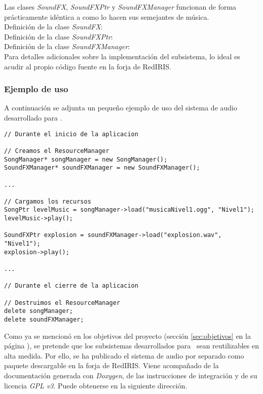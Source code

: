 Las clases \textit{SoundFX}, \textit{SoundFXPtr} y \textit{SoundFXManager}
funcionan de forma prácticamente idéntica a como lo hacen sus semejantes
de música.\\

Definición de la clase \textit{SoundFX}:\\



Definición de la clase \textit{SoundFXPtr}:\\



Definición de la clase \textit{SoundFXManager}:\\



Para detalles adicionales sobre la implementación del subsistema, lo ideal
es acudir al propio código fuente en la forja de RedIRIS.\\

\subsubsection{Ejemplo de uso}

A continuación se adjunta un pequeño ejemplo de uso del sistema de audio
desarrollado para \juego.

\begin{lstlisting}[style=C++]
// Durante el inicio de la aplicacion

// Creamos el ResourceManager
SongManager* songManager = new SongManager();
SoundFXManager* soundFXManager = new SoundFXManager();

...

// Cargamos los recursos
SongPtr levelMusic = songManager->load("musicaNivel1.ogg", "Nivel1");
levelMusic->play();

SoundFXPtr explosion = soundFXManager->load("explosion.wav", "Nivel1");
explosion->play();

...

// Durante el cierre de la aplicacion

// Destruimos el ResourceManager
delete songManager;
delete soundFXManager;
\end{lstlisting}

Como ya se mencionó en los objetivos del proyecto (sección \ref{sec:objetivos} en la
página \pageref{sec:objetivos}), se pretende que los subsistemas desarrollados para
\juego\ sean reutilizables en alta medida. Por ello, se ha publicado
el sistema de audio por separado como paquete descargable en la forja de
RedIRIS. Viene acompañado de la documentación generada con \textit{Doxygen},
de las instrucciones de integración y de su licencia \textit{GPL v3}. Puede
obtenerse en la siguiente dirección.\\

